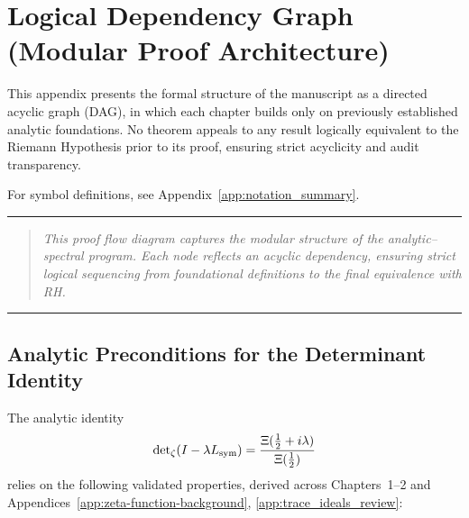 \section{Logical Dependency Graph (Modular Proof Architecture)}
\label{app:dependency_graph}

This appendix presents the formal structure of the manuscript as a directed acyclic graph (DAG), in which each chapter builds only on previously established analytic foundations. No theorem appeals to any result logically equivalent to the Riemann Hypothesis prior to its proof, ensuring strict acyclicity and audit transparency.

For symbol definitions, see Appendix~\ref{app:notation_summary}.

\vspace{1ex}
\hrule
\vspace{1ex}

\begin{quote}
\textit{This proof flow diagram captures the modular structure of the analytic–spectral program. Each node reflects an acyclic dependency, ensuring strict logical sequencing from foundational definitions to the final equivalence with RH.}
\end{quote}

\vspace{1ex}
\hrule
\vspace{2ex}

\subsection*{Analytic Preconditions for the Determinant Identity}
\label{dag:determinant_preconditions}

The analytic identity
\[
\det\nolimits_\zeta(I - \lambda L_{\mathrm{sym}}) = \frac{\Xi(\tfrac{1}{2} + i\lambda)}{\Xi(\tfrac{1}{2})}
\]
relies on the following validated properties, derived across Chapters~1–2 and Appendices~\ref{app:zeta-function-background}, \ref{app:trace_ideals_review}:

